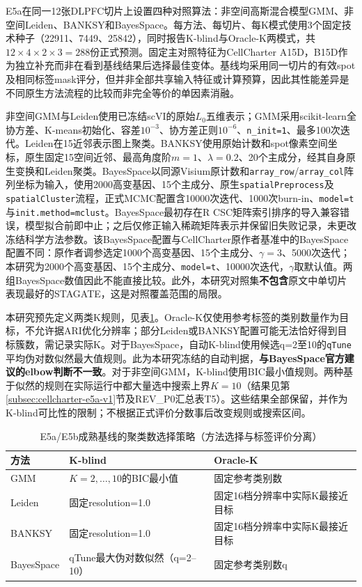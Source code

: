 E5a在同一12张DLPFC切片上设置四种对照算法：非空间高斯混合模型GMM、非空间Leiden、BANKSY和BayesSpace。每方法、每切片、每K模式使用3个固定技术种子（22911、7449、25842），同时报告K-blind与Oracle-K两模式，共$12\times4\times2\times3=288$份正式预测。固定主对照特征为CellCharter A15D，B15D作为独立补充而非在看到基线结果后选择最佳变体。基线均采用同一切片的有效spot及相同标签mask评分，但并非全部共享输入特征或计算预算，因此其性能差异是不同原生方法流程的比较而非完全等价的单因素消融。

非空间GMM与Leiden使用已冻结scVI的原始$L_0$五维表示；GMM采用scikit-learn全协方差、K-means初始化、容差$10^{-3}$、协方差正则$10^{-6}$、\texttt{n\_init=1}、最多100次迭代。Leiden在15近邻表示图上聚类。BANKSY使用原始计数和spot像素空间坐标，原生固定15空间近邻、最高角度阶$m=1$、$\lambda=0.2$、20个主成分，经其自身原生变换和Leiden聚类。BayesSpace以同源Visium原计数和\texttt{array\_row}/\texttt{array\_col}阵列坐标为输入，使用2000高变基因、15个主成分、原生\texttt{spatialPreprocess}及\texttt{spatialCluster}流程，正式MCMC配置含10000次迭代、1000次burn-in、\texttt{model=t}与\texttt{init.method=mclust}。BayesSpace最初存在R CSC矩阵索引排序的导入兼容错误，模型拟合前即中止；之后仅修正输入稀疏矩阵表示并保留旧失败记录，未更改冻结科学方法参数。该BayesSpace配置与CellCharter原作者基准中的BayesSpace配置不同：原作者调参选定1000个高变基因、15个主成分、$\gamma=3$、5000次迭代\cite{varrone2024,cellcharteranalyses2024}；本研究为2000个高变基因、15个主成分、\texttt{model=t}、10000次迭代，$\gamma$取默认值。两组BayesSpace数值因此不能直接比较。此外，本研究对照集\textbf{不包含}原文中单切片表现最好的STAGATE\cite{dong2022stagate}，这是对照覆盖范围的局限。

本研究预先定义两类K规则，见表\ref{tab:cc-baseline-K-v1}。Oracle-K仅使用参考标签的类别数量作为目标，不允许据ARI优化分辨率；部分Leiden或BANKSY配置可能无法恰好得到目标簇数，需记录实际K。对于BayesSpace，自动K-blind使用候选q=2至10的\texttt{qTune}平均伪对数似然最大值规则。此为本研究冻结的自动判据，\textbf{与BayesSpace官方建议的elbow判断不一致}\cite{bayesspacevignette}。对于非空间GMM，K-blind使用BIC最小值规则。两种基于似然的规则在实际运行中都大量选中搜索上界$K=10$（结果见第\ref{subsec:cellcharter-e5a-v1}节及REV\_P0汇总表T5）。这些结果全部保留，并作为K-blind可比性的限制；不根据正式评价分数事后改变规则或搜索区间。

\begin{table}[htbp]
\centering
\caption{E5a/E5b成熟基线的聚类数选择策略（方法选择与标签评价分离）}
\label{tab:cc-baseline-K-v1}
\begin{tabular}{lll}
\toprule
方法 & K-blind & Oracle-K\\
\midrule
GMM & $K=2,\ldots,10$的BIC最小值 & 固定参考类别数\\
Leiden & 固定resolution=1.0 & 固定16档分辨率中实际K最接近目标\\
BANKSY & 固定resolution=1.0 & 固定16档分辨率中实际K最接近目标\\
BayesSpace & qTune最大伪对数似然（q=2--10） & 固定参考类别数q\\
\bottomrule
\end{tabular}
\end{table}


